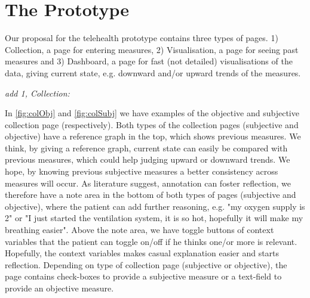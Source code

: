 \section{The Prototype}

Our proposal for the telehealth prototype contains three types of pages. 1) Collection, a page for entering measures, 2) Visualisation, a page for seeing past measures and 3) Dashboard, a page for fast (not detailed) visualisations of the data, giving current state, e.g. downward and/or upward trends of the measures.

\textit{add 1, Collection:}

In \ref{fig:colObj} and \ref{fig:colSubj} we have examples of the objective and subjective collection page (respectively).
Both types of the collection pages (subjective and objective) have a reference graph in the top, which shows previous measures. We think, by giving a reference graph, current state can easily be compared with previous measures, which could help judging upward or downward trends. We hope, by knowing previous subjective measures a better consistency across measures will occur. As literature suggest, annotation can foster reflection, we therefore have a note area in the bottom of both types of pages (subjective and objective), where the patient can add further reasoning, e.g. "my oxygen supply is 2" or "I just started the ventilation system, it is so hot, hopefully it will make my breathing easier". Above the note area, we have toggle buttons of context variables that the patient can toggle on/off if he thinks one/or more is relevant. Hopefully, the context variables makes casual explanation easier and starts reflection. Depending on type of collection page (subjective or objective), the page contains check-boxes to provide a subjective measure or a text-field to provide an objective measure.


